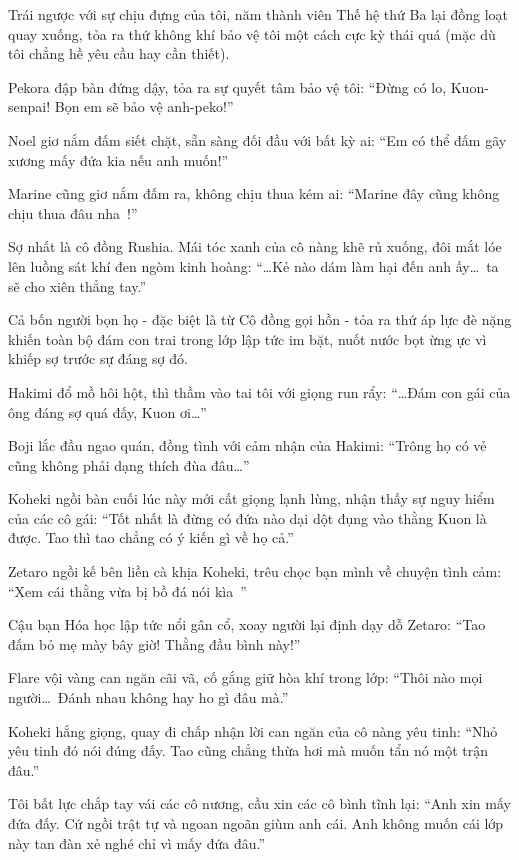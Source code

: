 \documentclass[../main.tex]{subfiles}
\begin{document}
Trái ngược với sự chịu đựng của tôi, năm thành viên Thế hệ thứ Ba lại đồng loạt quay xuống, tỏa ra thứ không khí bảo vệ tôi một cách cực kỳ thái quá (mặc dù tôi chẳng hề yêu cầu hay cần thiết).

Pekora đập bàn đứng dậy, tỏa ra sự quyết tâm bảo vệ tôi: ``Đừng có lo, Kuon-senpai! Bọn em sẽ bảo vệ anh-peko!''

Noel giơ nắm đấm siết chặt, sẵn sàng đối đầu với bất kỳ ai: ``Em có thể đấm gãy xương mấy đứa kia nếu anh muốn!''

Marine cũng giơ nắm đấm ra, không chịu thua kém ai: ``Marine đây cũng không chịu thua đâu nha~!''

Sợ nhất là cô đồng Rushia. Mái tóc xanh của cô nàng khẽ rủ xuống, đôi mắt lóe lên luồng sát khí đen ngòm kinh hoàng: ``\dots Kẻ nào dám làm hại đến anh ấy\dots\ ta sẽ cho xiên thẳng tay.''

Cả bốn người bọn họ - đặc biệt là từ Cô đồng gọi hồn - tỏa ra thứ áp lực đè nặng khiến toàn bộ đám con trai trong lớp lập tức im bặt, nuốt nước bọt ừng ực vì khiếp sợ trước sự đáng sợ đó.

Hakimi đổ mồ hôi hột, thì thầm vào tai tôi với giọng run rẩy: ``\dots Đám con gái của ông đáng sợ quá đấy, Kuon ơi\dots''

Boji lắc đầu ngao quán, đồng tình với cảm nhận của Hakimi: ``Trông họ có vẻ cũng không phải dạng thích đùa đâu\dots''

Koheki ngồi bàn cuối lúc này mới cất giọng lạnh lùng, nhận thấy sự nguy hiểm của các cô gái: ``Tốt nhất là đừng có đứa nào dại dột đụng vào thằng Kuon là được. Tao thì tao chẳng có ý kiến gì về họ cả.''

Zetaro ngồi kế bên liền cà khịa Koheki, trêu chọc bạn mình về chuyện tình cảm: ``Xem cái thằng vừa bị bồ đá nói kìa~''

Cậu bạn Hóa học lập tức nổi gân cổ, xoay người lại định dạy dỗ Zetaro: ``Tao đấm bỏ mẹ mày bây giờ! Thằng đầu bình này!''

Flare vội vàng can ngăn cãi vã, cố gắng giữ hòa khí trong lớp: ``Thôi nào mọi người\dots\ Đánh nhau không hay ho gì đâu mà.''

Koheki hắng giọng, quay đi chấp nhận lời can ngăn của cô nàng yêu tinh: ``Nhỏ yêu tinh đó nói đúng đấy. Tao cũng chẳng thừa hơi mà muốn tẩn nó một trận đâu.''

Tôi bất lực chắp tay vái các cô nương, cầu xin các cô bình tĩnh lại: ``Anh xin mấy đứa đấy. Cứ ngồi trật tự và ngoan ngoãn giùm anh cái. Anh không muốn cái lớp này tan đàn xẻ nghé chỉ vì mấy đứa đâu.''
\end{document}
